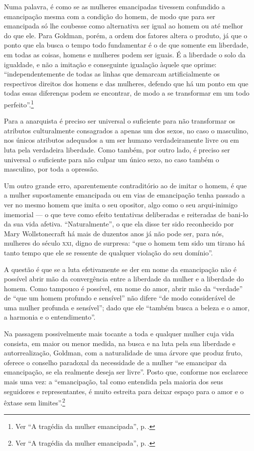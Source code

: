 Numa palavra, é como se as mulheres emancipadas tivessem
confundido a emancipação mesma com a condição do homem, de modo que para
ser emancipada só lhe coubesse como alternativa ser igual ao homem ou
até melhor do que ele. Para Goldman, porém, a ordem dos fatores
altera o produto, já que o ponto que ela
busca o tempo todo fundamentar é o de que somente em liberdade,
em todas as coisas, homens e mulheres podem ser iguais. É a liberdade
o solo da igualdade, e não a imitação e conseguinte igualação
àquele que oprime: ``independentemente de todas as linhas que demarcam artificialmente os
respectivos direitos dos homens e das mulheres, defendo que há um ponto
em que todas essas diferenças podem se encontrar, de modo a se
transformar em um todo perfeito''.\footnote{Ver ``A tragédia da mulher emancipada'', p.\,\pageref{perfeito}.}


Para
a anarquista é preciso ser universal o suficiente para não transformar
os atributos culturalmente consagrados a apenas um dos sexos, no caso o
masculino, nos únicos atributos adequados a um ser humano
verdadeiramente livre ou em luta pela verdadeira liberdade. Como também,
por outro lado, é preciso ser universal o suficiente para não culpar um
único sexo, no caso também o masculino, por toda a opressão.

Um outro grande erro, aparentemente contraditório ao de imitar o homem,
é que a mulher supostamente emancipada ou em vias de
emancipação tenha passado a ver no mesmo homem que imita o seu opositor,
algo como o seu arqui-inimigo imemorial --- o que teve como efeito
tentativas deliberadas e reiteradas de bani-lo da sua vida afetiva.
``Naturalmente'', o que ela disse ter sido reconhecido por Mary
Wollstonecraft há mais de duzentos anos já não pode ser, para nós, mulheres
do século \textsc{xxi}, digno de surpresa: ``que o homem tem sido um tirano há
tanto tempo que ele se ressente de qualquer violação do seu domínio''.

A
questão é que se a luta efetivamente se der em nome da
emancipação não é possível abrir mão da convergência entre a
liberdade da mulher e a liberdade do homem. Como tampouco é possível, em
nome do amor, abrir mão da ``verdade'' de ``que um homem profundo e
sensível'' não difere ``de modo considerável de uma mulher profunda e
sensível''; dado que ele ``também busca a beleza e o amor, a harmonia e
o entendimento''.

Na passagem possivelmente mais tocante a toda e
qualquer mulher cuja vida consista, em maior ou menor medida, na busca e
na luta pela sua liberdade e autorrealização, Goldman, com a
naturalidade de uma árvore que produz fruto, oferece o conselho
paradoxal da necessidade de a mulher ``se emancipar da emancipação, se
ela realmente deseja ser livre''. Posto que, conforme nos esclarece mais
uma vez: a ``emancipação, tal como entendida pela maioria dos seus
seguidores e representantes, é muito estreita para deixar espaço para o
amor e o êxtase sem limites''.\footnote{Ver ``A tragédia da mulher emancipada'', p.\,\pageref{extase}.}


